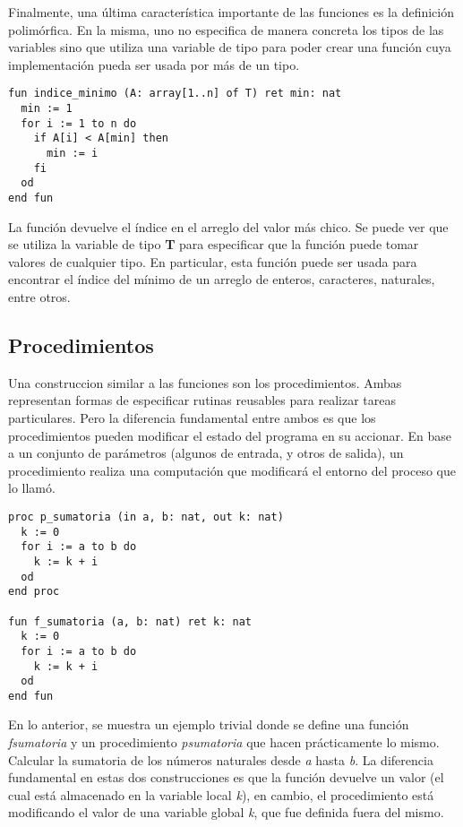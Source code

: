 \documentclass{article}
\newcommand{\gbajo}{\textunderscore}
\begin{document}
Finalmente, una última característica importante de las funciones es la definición polimórfica.
En la misma, uno no especifica de manera concreta los tipos de las variables sino que utiliza una variable de tipo para poder crear una función cuya implementación pueda ser usada por más de un tipo.

\begin{lstlisting}
fun indice_minimo (A: array[1..n] of T) ret min: nat
  min := 1
  for i := 1 to n do
    if A[i] < A[min] then
      min := i
    fi
  od
end fun
\end{lstlisting}

La función devuelve el índice en el arreglo del valor más chico.
Se puede ver que se utiliza la variable de tipo \textbf{T} para especificar que la función puede tomar valores de cualquier tipo.
En particular, esta función puede ser usada para encontrar el índice del mínimo de un arreglo de enteros, caracteres, naturales, entre otros.

\subsection{Procedimientos}
Una construccion similar a las funciones son los procedimientos.
Ambas representan formas de especificar rutinas reusables para realizar tareas particulares.
Pero la diferencia fundamental entre ambos es que los procedimientos pueden modificar el estado del programa en su accionar.
En base a un conjunto de parámetros (algunos de entrada, y otros de salida), un procedimiento realiza una computación que modificará el entorno del proceso que lo llamó.

\begin{lstlisting}
proc p_sumatoria (in a, b: nat, out k: nat)
  k := 0
  for i := a to b do
    k := k + i
  od
end proc

fun f_sumatoria (a, b: nat) ret k: nat
  k := 0
  for i := a to b do
    k := k + i
  od
end fun
\end{lstlisting}

En lo anterior, se muestra un ejemplo trivial donde se define una función \textit{f\gbajo sumatoria} y un procedimiento \textit{p\gbajo sumatoria} que hacen prácticamente lo mismo.
Calcular la sumatoria de los números naturales desde \textit{a} hasta \textit{b}.
La diferencia fundamental en estas dos construcciones es que la función devuelve un valor (el cual está almacenado en la variable local \textit{k}), en cambio, el procedimiento está modificando el valor de una variable global \textit{k}, que fue definida fuera del mismo.
\end{document}
